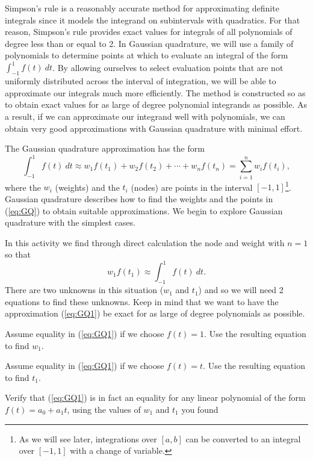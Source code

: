 \ee


Simpson's rule is a reasonably accurate method for approximating definite integrals since it  models the integrand on subintervals with quadratics. For that reason, Simpson's rule provides exact values for integrals of all polynomials of degree less than or equal to 2. In Gaussian quadrature, we will use a family of polynomials to determine points at which to evaluate an integral of the form $\int_{-1}^1 f(t) \ dt$. By allowing ourselves to select evaluation points that are not uniformly distributed across the interval of integration, we will be able to approximate our integrals much more efficiently. The method is constructed so as to obtain exact values for as large of degree polynomial integrands as possible. As a result, if we can approximate our integrand well with polynomials, we can obtain very good approximations with Gaussian quadrature with minimal effort.

The Gaussian quadrature approximation has the form
\begin{equation}
\int_{-1}^1 f(t) \ dt \approx w_1f(t_1) + w_2 f(t_2) + \cdots + w_n f(t_n) = \sum_{i=1}^n w_if(t_i), \label{eq:GQ}
\end{equation}
where the $w_i$ (weights) and the $t_i$ (nodes) are points in the interval $[-1,1]$\footnote{As we will see later, integrations over $[a,b]$ can be converted to an integral over $[-1,1]$ with a change of variable.}. Gaussian quadrature describes how to find the weights and the points in (\ref{eq:GQ}) to obtain suitable approximations. We begin to explore Gaussian quadrature with the simplest cases.

\begin{pactivity} \label{act:GQ_1} In this activity we find through direct calculation the node and weight with $n=1$ so that
\begin{equation}
w_1f(t_1) \approx \int_{-1}^1 f(t) \ dt. \label{eq:GQ1}
\end{equation}
There are two unknowns in this situation ($w_1$ and $t_1$) and so we will need 2 equations to find these unknowns. Keep in mind that we want to have the approximation (\ref{eq:GQ1}) be exact for as large of degree polynomials as possible.
	\ba
	\item Assume equality in (\ref{eq:GQ1}) if we choose $f(t) = 1$. Use the resulting equation to find $w_1$.
	

	\item Assume equality in (\ref{eq:GQ1}) if we choose $f(t) = t$. Use the resulting equation to find $t_1$.

	
	\item Verify that (\ref{eq:GQ1}) is in fact an equality for any linear polynomial of the form $f(t) = a_0+a_1t$, using the values of $w_1$ and $t_1$ you found
	
	\ea
\end{pactivity}

